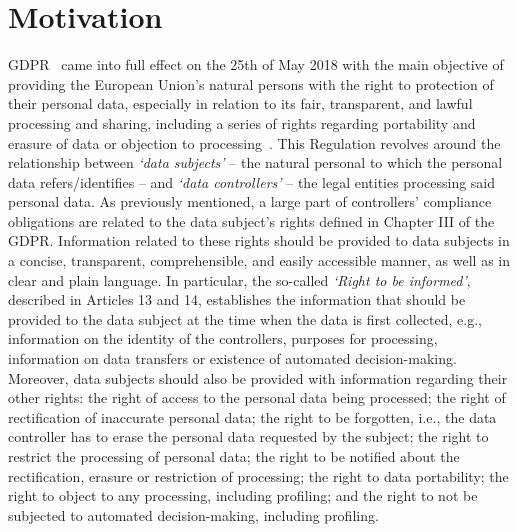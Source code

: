 \section{Motivation}
\label{sec:motivation}

GDPR~\citeyearpar{noauthor_regulation_2016} came into full effect on the 25th of May 2018 with the main objective of providing the European Union’s natural persons with the right to protection of their personal data, especially in relation to its fair, transparent, and lawful processing and sharing, including a series of rights regarding portability and erasure of data or objection to processing~\citep{ausloos_getting_2019}.
This Regulation revolves around the relationship between \textit{`data subjects'} -- the natural personal to which the personal data refers/identifies -- and \textit{`data controllers'} -- the legal entities processing said personal data.
As previously mentioned, a large part of controllers' compliance obligations are related to the data subject’s rights defined in Chapter III of the GDPR.
Information related to these rights should be provided to data subjects in a concise, transparent, comprehensible, and easily accessible manner, as well as in clear and plain language.
In particular, the so-called \textit{`Right to be informed'}, described in Articles 13 and 14, establishes the information that should be provided to the data subject at the time when the data is first collected, e.g., information on the identity of the controllers, purposes for processing, information on data transfers or existence of automated decision-making.
Moreover, data subjects should also be provided with information regarding their other rights:
the right of access to the personal data being processed;
the right of rectification of inaccurate personal data;
the right to be forgotten, i.e., the data controller has to erase the personal data requested by the subject;
the right to restrict the processing of personal data;
the right to be notified about the rectification, erasure or restriction of processing;
the right to data portability;
the right to object to any processing, including profiling;
and the right to not be subjected to automated decision-making, including profiling.

